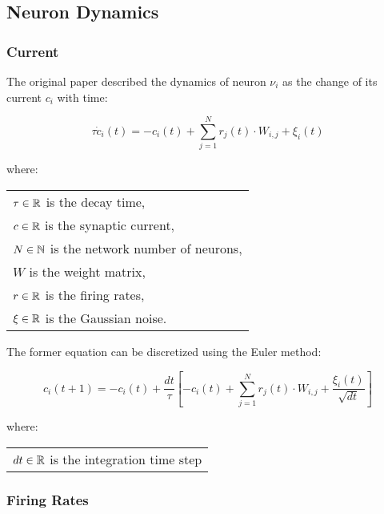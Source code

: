 \subsection{Neuron Dynamics}
\label{subsec:neuron_dynamics}


\subsubsection{Current}

The original paper described the dynamics of neuron \(\nu_{i}\) as the change of its current \(c_{i}\) with time:

        \begin{equation}
            \tau \dot{c}_{i}(t) = - {c}_{i}(t) + \sum_{j=1}^{N} r_{j}(t) \cdot W_{i,j} + \xi_{i}(t)
        \label{eq:continuous_dynamics} \end{equation}

        where:

        \begin{tabular}{l} \\
            \(\tau \in \mathbb{R}\) is the decay time, \\
            \(c \in \mathbb{R}\) is the synaptic current, \\
            \(N \in \mathbb{N}\) is the network number of neurons, \\
            \(W\) is the weight matrix, \\
            \(r \in \mathbb{R}\) is the firing rates, \\
            \(\xi \in \mathbb{R}\) is the Gaussian noise.
        \label{tab:conditions_continuous_dynamics} \end{tabular}



    The former equation can be discretized using the Euler method:

        \begin{equation}
            c_{i}(t+1) = -c_{i}(t) + \frac{dt}{\tau} \left[-c_{i}(t) + \sum_{j=1}^{N} r_{j}(t) \cdot W_{i,j} + \frac{\xi_{i}(t)}{\sqrt{dt}} \right]
        \label{eq:discrete_dynamics} \end{equation}

        where:

        \begin{tabular}{l}
            \(dt \in \mathbb{R}\) is the integration time step
        \label{tab:conditions_discrete_dynamics} \end{tabular}

\subsubsection{Firing Rates}

